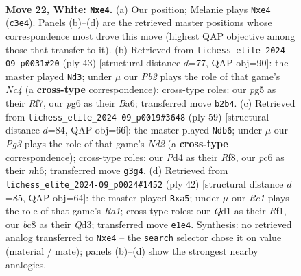 \documentclass[11pt]{article}
\begin{document}
\begin{figure}[p]
\label{fig:thought-m40}
\end{figure}

\clearpage

\begin{figure}[p]\centering
\begin{subfigure}{0.46\textwidth}\centering
\resizebox{\linewidth}{!}{%
\newchessgame
\chessboard[
  setfen={r1b5/pp1n2kp/2pqr1p1/6p1/2BPp3/2N2PP1/PP3K1P/2RQR3 w - - 2 22},
  showmover=false,
  pgfstyle=straightmove, color=movearrow, markmove={c3-e4}
]}
\caption{}
\end{subfigure}\hfill
\begin{subfigure}{0.46\textwidth}\centering
\resizebox{\linewidth}{!}{%
\newchessgame
\chessboard[
  setfen={3r2k1/4qr1p/bpp2pp1/p1nP4/P1p1PB2/2P1R3/1P1NQ1PP/R5K1 b - - 0 22},
  showmover=false,
  pgfstyle=straightmove, color=movearrow, markmove={c5-d3}
]}
\caption{}
\end{subfigure}
\\[4pt]
\begin{subfigure}{0.46\textwidth}\centering
\resizebox{\linewidth}{!}{%
\newchessgame
\chessboard[
  setfen={5r2/p2nqp2/k3r2N/1p1p2P1/n1pPPB2/5P2/P1Q4P/4RR1K b - - 0 30},
  showmover=false,
  pgfstyle=straightmove, color=movearrow, markmove={d7-b6}
]}
\caption{}
\end{subfigure}\hfill
\begin{subfigure}{0.46\textwidth}\centering
\resizebox{\linewidth}{!}{%
\newchessgame
\chessboard[
  setfen={rnb2rk1/2p3pp/3p1q2/pp1P1p2/1P3P2/3Q1NPB/4P2P/R4RK1 w - - 0 22},
  showmover=false,
  pgfstyle=straightmove, color=movearrow, markmove={a1-a5}
]}
\caption{}
\end{subfigure}
\caption{\textbf{Move 22, White: \texttt{Nxe4}.} (a) Our position; Melanie plays \texttt{Nxe4} (\texttt{c3e4}). Panels (b)--(d) are the retrieved master positions whose correspondence most drove this move (highest QAP objective among those that transfer to it). (b) Retrieved from \texttt{lichess\_elite\_2024-09\_p0031\#20} (ply 43) [structural distance $d$=77, QAP obj=90]: the master played \texttt{Nd3}; under $\mu$ our \emph{Pb2} plays the role of that game's \emph{Nc4} (a \textbf{cross-type} correspondence); cross-type roles: our \emph{p}g5 as their \emph{R}f7, our \emph{p}g6 as their \emph{B}a6; transferred move \texttt{b2b4}. (c) Retrieved from \texttt{lichess\_elite\_2024-09\_p0019\#3648} (ply 59) [structural distance $d$=84, QAP obj=66]: the master played \texttt{Ndb6}; under $\mu$ our \emph{Pg3} plays the role of that game's \emph{Nd2} (a \textbf{cross-type} correspondence); cross-type roles: our \emph{P}d4 as their \emph{R}f8, our \emph{p}c6 as their \emph{n}h6; transferred move \texttt{g3g4}. (d) Retrieved from \texttt{lichess\_elite\_2024-09\_p0024\#1452} (ply 42) [structural distance $d$=85, QAP obj=64]: the master played \texttt{Rxa5}; under $\mu$ our \emph{Re1} plays the role of that game's \emph{Ra1}; cross-type roles: our \emph{Q}d1 as their \emph{R}f1, our \emph{b}c8 as their \emph{Q}d3; transferred move \texttt{e1e4}. Synthesis: no retrieved analog transferred to \texttt{Nxe4} -- the \texttt{search} selector chose it on value (material / mate); panels (b)--(d) show the strongest nearby analogies.}

\end{figure}
\end{document}
